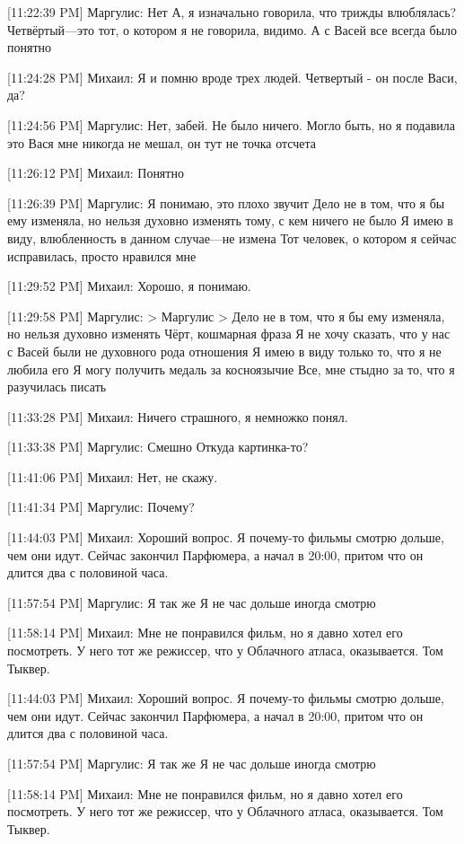 \documentclass{article}
\begin{document}
[11:22:39 PM] Маргулис:
Нет
 А, я изначально говорила, что трижды влюблялась?
 Четвёртый—это тот, о котором я не говорила, видимо. А с Васей все всегда было понятно

[11:24:28 PM] Михаил:
Я и помню вроде трех людей. Четвертый - он после Васи, да?

[11:24:56 PM] Маргулис:
Нет, забей.
 Не было ничего. Могло быть, но я подавила это
 Вася мне никогда не мешал, он тут не точка отсчета

[11:26:12 PM] Михаил:
Понятно

[11:26:39 PM] Маргулис:
Я понимаю, это плохо звучит
 Дело не в том, что я бы ему изменяла, но нельзя духовно изменять тому, с кем ничего не было
 Я имею в виду, влюбленность в данном случае—не измена
 Тот человек, о котором я сейчас исправилась, просто нравился мне

[11:29:52 PM] Михаил:
Хорошо, я понимаю.

[11:29:58 PM] Маргулис:
> Маргулис
> Дело не в том, что я бы ему изменяла, но нельзя духовно изменять
Чёрт, кошмарная фраза
 Я не хочу сказать, что у нас с Васей были не духовного рода отношения
 Я имею в виду только то, что я не любила его
 Я могу получить медаль за косноязычие
 Все, мне стыдно за то, что я разучилась писать

[11:33:28 PM] Михаил:
Ничего страшного, я немножко понял.

[11:33:38 PM] Маргулис:
Смешно
 Откуда картинка-то?

[11:41:06 PM] Михаил:
Нет, не скажу.

[11:41:34 PM] Маргулис:
Почему?

[11:44:03 PM] Михаил:
Хороший вопрос.
 Я почему-то фильмы смотрю дольше, чем они идут. Сейчас закончил Парфюмера, а начал в 20:00, притом что он длится два с половиной часа.

[11:57:54 PM] Маргулис:
Я так же
 Я не час дольше иногда смотрю

[11:58:14 PM] Михаил:
Мне не понравился фильм, но я давно хотел его посмотреть.
 У него тот же режиссер, что у Облачного атласа, оказывается. Том Тыквер.

[11:44:03 PM] Михаил:
Хороший вопрос.
 Я почему-то фильмы смотрю дольше, чем они идут. Сейчас закончил Парфюмера, а начал в 20:00, притом что он длится два с половиной часа.

[11:57:54 PM] Маргулис:
Я так же
 Я не час дольше иногда смотрю

[11:58:14 PM] Михаил:
Мне не понравился фильм, но я давно хотел его посмотреть.
 У него тот же режиссер, что у Облачного атласа, оказывается. Том Тыквер.
\end{document}
